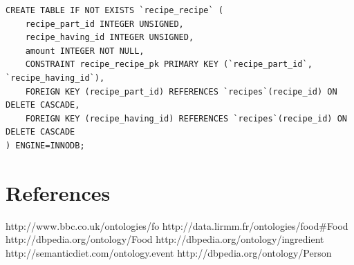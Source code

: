 \begin{lstlisting}[caption=Script of database]
CREATE TABLE IF NOT EXISTS `recipe_recipe` (
    recipe_part_id INTEGER UNSIGNED,
    recipe_having_id INTEGER UNSIGNED,
    amount INTEGER NOT NULL,
    CONSTRAINT recipe_recipe_pk PRIMARY KEY (`recipe_part_id`, `recipe_having_id`),
    FOREIGN KEY (recipe_part_id) REFERENCES `recipes`(recipe_id) ON DELETE CASCADE,
    FOREIGN KEY (recipe_having_id) REFERENCES `recipes`(recipe_id) ON DELETE CASCADE
) ENGINE=INNODB;

\end{lstlisting}
\section*{References}
http://www.bbc.co.uk/ontologies/fo\newline
http://data.lirmm.fr/ontologies/food\#Food\newline
http://dbpedia.org/ontology/Food \newline
http://dbpedia.org/ontology/ingredient\newline
http://semanticdiet.com/ontology.event \newline
http://dbpedia.org/ontology/Person \newline

